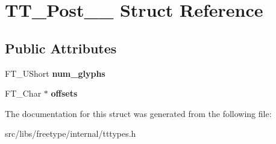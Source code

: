 \hypertarget{struct_t_t___post__25__}{
\section{TT\_\-Post\_\_\- Struct Reference}
\label{struct_t_t___post__25__}
}
\subsection*{Public Attributes}
\begin{DoxyCompactItemize}
\item 
\hypertarget{struct_t_t___post__25___aae397ce6206c910ecc13f8b46bace595}{
FT\_\-UShort {\bfseries num\_\-glyphs}}
\label{struct_t_t___post__25___aae397ce6206c910ecc13f8b46bace595}

\item 
\hypertarget{struct_t_t___post__25___a499ec966b258c8454e9ea8f9455028b6}{
FT\_\-Char $\ast$ {\bfseries offsets}}
\label{struct_t_t___post__25___a499ec966b258c8454e9ea8f9455028b6}

\end{DoxyCompactItemize}


The documentation for this struct was generated from the following file:\begin{DoxyCompactItemize}
\item 
src/libs/freetype/internal/tttypes.h\end{DoxyCompactItemize}
